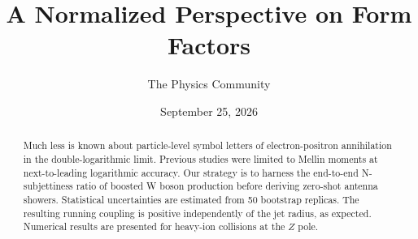 \documentclass[11pt]{article}
\title{A Normalized Perspective on Form Factors}
\author{The Physics Community}
\date{September 25, 2026}
\numberwithin{equation}{section}
\theoremstyle{definition}
\theoremstyle{remark}
\begin{document}
\maketitle
\begin{abstract}
Much less is known about particle-level symbol letters of
electron-positron annihilation in the double-logarithmic limit. Previous
studies were limited to Mellin moments at next-to-leading logarithmic
accuracy. Our strategy is to harness the end-to-end N-subjettiness ratio
of boosted W boson production before deriving zero-shot antenna showers.
Statistical uncertainties are estimated from 50 bootstrap replicas. The
resulting running coupling is positive independently of the jet radius,
as expected. Numerical results are presented for heavy-ion collisions at
the $Z$ pole.
\end{abstract}
\tableofcontents




\nocite{*}


\end{document}
